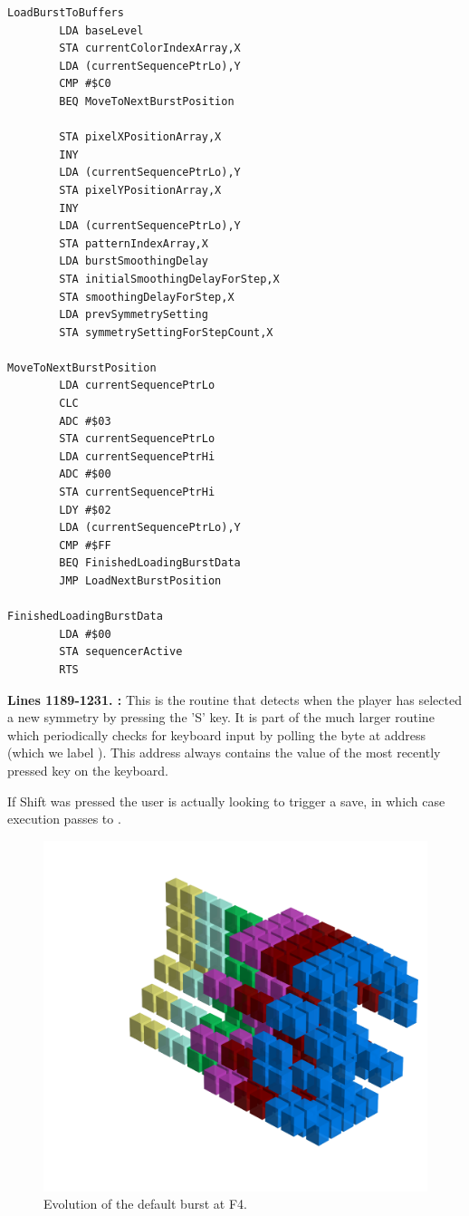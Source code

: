 \clearpage
\begin{lstlisting}
LoadBurstToBuffers
        LDA baseLevel
        STA currentColorIndexArray,X
        LDA (currentSequencePtrLo),Y
        CMP #$C0
        BEQ MoveToNextBurstPosition

        STA pixelXPositionArray,X
        INY 
        LDA (currentSequencePtrLo),Y
        STA pixelYPositionArray,X
        INY 
        LDA (currentSequencePtrLo),Y
        STA patternIndexArray,X
        LDA burstSmoothingDelay
        STA initialSmoothingDelayForStep,X
        STA smoothingDelayForStep,X
        LDA prevSymmetrySetting
        STA symmetrySettingForStepCount,X

MoveToNextBurstPosition
        LDA currentSequencePtrLo
        CLC 
        ADC #$03
        STA currentSequencePtrLo
        LDA currentSequencePtrHi
        ADC #$00
        STA currentSequencePtrHi
        LDY #$02
        LDA (currentSequencePtrLo),Y
        CMP #$FF
        BEQ FinishedLoadingBurstData
        JMP LoadNextBurstPosition

FinishedLoadingBurstData
        LDA #$00
        STA sequencerActive
        RTS 
\end{lstlisting}
\clearpage

\textbf{Lines 1189-1231. :} This is the routine that detects when the player has selected a new
symmetry by pressing the 'S' key. It is part of the much larger routine  which periodically checks
for keyboard input by polling the byte at address  (which we label ). This address always
contains the value of the most recently pressed key on the keyboard.

If Shift was pressed the user is actually looking to trigger a save, in which case execution passes to .
\clearpage
\begin{figure}[H]
    \centering
    \begin{adjustbox}{width=12cm,center}
      \includegraphics[width=12cm]{src/patterns/bursts/pattern3-45.png}%
    \end{adjustbox}
\caption{Evolution of the default burst at F4.}
\end{figure}
\clearpage

